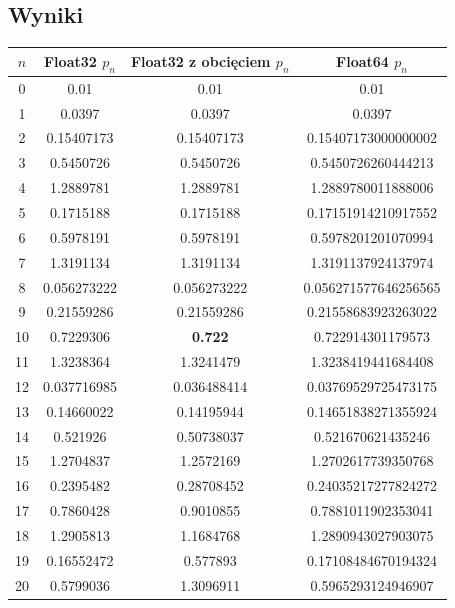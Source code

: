 \documentclass{article}
\begin{document}
\subsection{Wyniki}
\begin{table}[H]
\begin{adjustbox}{center}
\begin{tabular}{|c|c|c|c|}
    \hline
    $n$ & Float32 $p_n$ & Float32 z obcięciem $p_n$ & Float64 $p_n$\\
    \hline
    0 & 0.01 & 0.01 & 0.01\\
    \hline
    1 & 0.0397 & 0.0397 & 0.0397\\
    \hline
    2 & 0.15407173 & 0.15407173 & 0.15407173000000002\\
    \hline
    3 & 0.5450726 & 0.5450726 & 0.5450726260444213\\
    \hline
    4 & 1.2889781 & 1.2889781 & 1.2889780011888006\\
    \hline
    5 & 0.1715188 & 0.1715188 & 0.17151914210917552\\
    \hline
    6 & 0.5978191 & 0.5978191 & 0.5978201201070994\\
    \hline
    7 & 1.3191134 & 1.3191134 & 1.3191137924137974\\
    \hline
    8 & 0.056273222 & 0.056273222 & 0.056271577646256565\\
    \hline
    9 & 0.21559286 & 0.21559286 & 0.21558683923263022\\
    \hline
    10 & 0.7229306 & \textbf{0.722} & 0.722914301179573\\
    \hline
    11 & 1.3238364 & 1.3241479 & 1.3238419441684408\\
    \hline
    12 & 0.037716985 & 0.036488414 & 0.03769529725473175\\
    \hline
    13 & 0.14660022 & 0.14195944 & 0.14651838271355924\\
    \hline
    14 & 0.521926 & 0.50738037 & 0.521670621435246\\
    \hline
    15 & 1.2704837 & 1.2572169 & 1.2702617739350768\\
    \hline
    16 & 0.2395482 & 0.28708452 & 0.24035217277824272\\
    \hline
    17 & 0.7860428 & 0.9010855 & 0.7881011902353041\\
    \hline
    18 & 1.2905813 & 1.1684768 & 1.2890943027903075\\
    \hline
    19 & 0.16552472 & 0.577893 & 0.17108484670194324\\
    \hline
    20 & 0.5799036 & 1.3096911 & 0.5965293124946907\\

\end{tabular}
\end{adjustbox}
\end{table}
\end{document}
